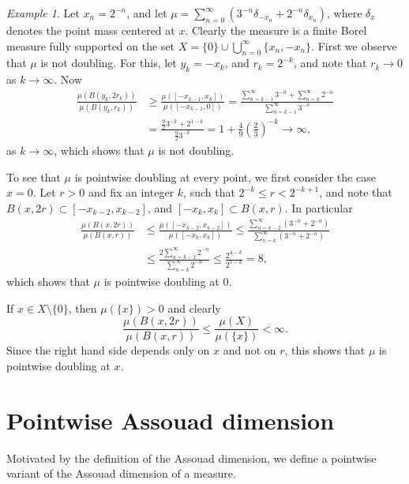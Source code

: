 \documentclass{PRM}
\theoremstyle{plain}
\theoremstyle{definition}
\theoremstyle{remark}
\newtheorem{example}[thm]{Example}
\begin{document}
\begin{example}\label{ex:loc_not_glob_doubling}
Let $x_n=2^{-n}$, and let $\mu=\sum_{n=0}^{\infty}(3^{-n}\delta_{-x_n}+2^{-n}\delta_{x_n})$, where $\delta_x$ denotes the point mass centered at $x$. Clearly the measure is a finite Borel measure fully supported on the set $X=\{0\}\cup\bigcup_{n=0}^{\infty}\{x_n,-x_n\}$. First we observe that $\mu$ is not doubling.
For this, let $y_k=-x_k$, and $r_k=2^{-k}$, and note that $r_k\to0$ as $k\to \infty$. Now
\begin{align*}
    \frac{\mu(B(y_k,2r_k))}{\mu(B(y_k,r_k))}&\geq\frac{\mu([-x_{k-1},x_k])}{\mu([-x_{k-1},0])}=\frac{\sum_{n=k-1}^{\infty}3^{-n}+\sum_{n=k}^{\infty}2^{-n}}{\sum_{n=k-1}^{\infty}3^{-n}}\\
    &=\frac{\frac{9}{2}3^{-k}+2^{1-k}}{\frac{9}{2}3^{-k}}=1+\frac{4}{9}\left(\frac{2}{3}\right)^{-k} \to \infty,
\end{align*}
as $k\to\infty$, which shows that $\mu$ is not doubling.

To see that $\mu$ is pointwise doubling at every point, we first consider the case $x=0$. Let $r>0$ and fix an integer $k$, such that $2^{-k}\leq r < 2^{-k+1}$, and note that $B(x,2r)\subset [-x_{k-2},x_{k-2}]$, and $[-x_k,x_k]\subset B(x,r)$. In particular
\begin{align*}
    \frac{\mu(B(x,2r))}{\mu(B(x,r))}&\leq\frac{\mu([-x_{k-2},x_{k-2}])}{\mu([-x_{k},x_{k}])}\leq\frac{\sum_{n=k-2}^{\infty}(3^{-n}+2^{-n})}{\sum_{n=k}^{\infty}(3^{-n}+2^{-n})}\\
    &\leq \frac{2\sum_{n=k-2}^{\infty}2^{-n}}{\sum_{n=k}^{\infty}2^{-n}}\leq\frac{2^{4-k}}{2^{1-k}}=8,
\end{align*}
which shows that $\mu$ is pointwise doubling at $0$.

If $x\in X\setminus\{0\}$, then  $\mu(\{x\})>0$ and clearly
\begin{equation*}
    \frac{\mu(B(x,2r))}{\mu(B(x,r))}\leq \frac{\mu(X)}{\mu(\{x\})}<\infty.
\end{equation*}
Since the right hand side depends only on $x$ and not on $r$, this shows that $\mu$ is pointwise doubling at $x$.
\end{example}

\section{Pointwise Assouad dimension}\label{sec:pw_assouad}
Motivated by the definition of the Assouad dimension, we define a pointwise variant of the Assouad dimension of a measure.
\end{document}
